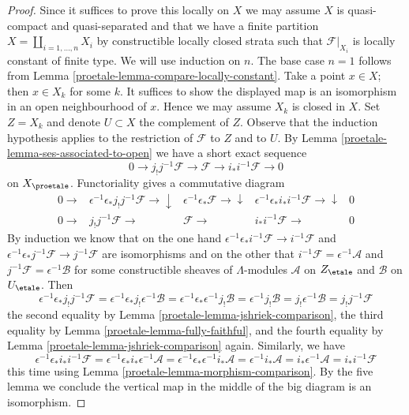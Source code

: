 \begin{proof}
\medskip\noindent
Since it suffices to prove this locally on $X$ we may assume $X$ is
quasi-compact and quasi-separated and that we have
a finite partition $X = \coprod_{i = 1, \ldots, n} X_i$
by constructible locally closed strata such that $\mathcal{F}|_{X_i}$
is locally constant of finite type. We will use induction on $n$.
The base case $n = 1$ follows from Lemma \ref{proetale-lemma-compare-locally-constant}.
Take a point $x \in X$; then $x \in X_k$ for some $k$.
It suffices to show the displayed map is an isomorphism in an
open neighbourhood of $x$. Hence we may assume $X_k$ is closed in $X$.
Set $Z = X_k$ and denote $U \subset X$ the complement of $Z$.
Observe that the induction hypothesis applies to the restriction of
$\mathcal{F}$ to $Z$ and to $U$. By Lemma \ref{proetale-lemma-ses-associated-to-open}
we have a short exact sequence
$$
0 \to j_!j^{-1}\mathcal{F} \to \mathcal{F} \to i_*i^{-1}\mathcal{F} \to 0
$$
on $X_\proetale$. Functoriality gives a commutative diagram
$$
\begin{array}{ccccc}0 \longrightarrow & \epsilon^{-1}\epsilon_*j_!j^{-1}\mathcal{F} \longrightarrow\downarrow & \epsilon^{-1}\epsilon_*\mathcal{F} \longrightarrow\downarrow & \epsilon^{-1}\epsilon_*i_*i^{-1}\mathcal{F} \longrightarrow\downarrow & 0 \\ 0 \longrightarrow & j_!j^{-1}\mathcal{F} \longrightarrow & \mathcal{F} \longrightarrow & i_*i^{-1}\mathcal{F} \longrightarrow & 0\end{array}
$$
By induction we know that on the one hand
$\epsilon^{-1}\epsilon_*i^{-1}\mathcal{F} \to i^{-1}\mathcal{F}$
and
$\epsilon^{-1}\epsilon_*j^{-1}\mathcal{F} \to j^{-1}\mathcal{F}$
are isomorphisms and on the other that
$i^{-1}\mathcal{F} = \epsilon^{-1}\mathcal{A}$
and
$j^{-1}\mathcal{F} = \epsilon^{-1}\mathcal{B}$
for some constructible sheaves of $\Lambda$-modules
$\mathcal{A}$ on $Z_\etale$ and $\mathcal{B}$ on $U_\etale$.
Then
$$
\epsilon^{-1}\epsilon_*j_!j^{-1}\mathcal{F} =
\epsilon^{-1}\epsilon_*j_!\epsilon^{-1}\mathcal{B} =
\epsilon^{-1}\epsilon_*\epsilon^{-1}j_!\mathcal{B} =
\epsilon^{-1}j_!\mathcal{B} =
j_!\epsilon^{-1}\mathcal{B} =
j_!j^{-1}\mathcal{F}
$$
the second equality by Lemma \ref{proetale-lemma-jshriek-comparison},
the third equality by Lemma \ref{proetale-lemma-fully-faithful}, and the
fourth equality by Lemma \ref{proetale-lemma-jshriek-comparison} again.
Similarly, we have
$$
\epsilon^{-1}\epsilon_*i_*i^{-1}\mathcal{F} =
\epsilon^{-1}\epsilon_*i_*\epsilon^{-1}\mathcal{A} =
\epsilon^{-1}\epsilon_*\epsilon^{-1}i_*\mathcal{A} =
\epsilon^{-1}i_*\mathcal{A} =
i_*\epsilon^{-1}\mathcal{A} =
i_*i^{-1}\mathcal{F}
$$
this time using Lemma \ref{proetale-lemma-morphism-comparison}.
By the five lemma we conclude the
vertical map in the middle of the big diagram is an isomorphism.
\end{proof}

